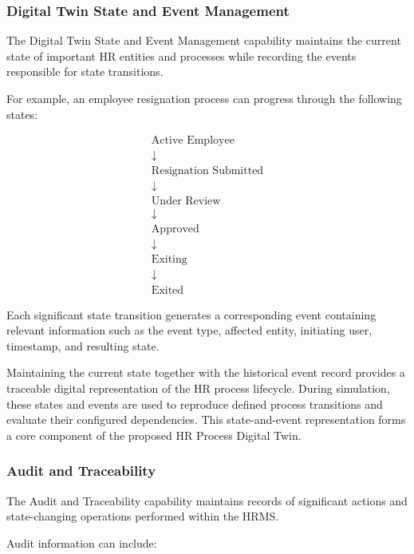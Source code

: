 \documentclass[12pt,a4paper]{article}
\begin{document}
\subsubsection{Digital Twin State and Event Management}

The Digital Twin State and Event Management capability maintains
the current state of important HR entities and processes while
recording the events responsible for state transitions.

For example, an employee resignation process can progress through
the following states:

\[
\begin{array}{c}
\text{Active Employee} \\[3pt]
\downarrow \\[3pt]
\text{Resignation Submitted} \\[3pt]
\downarrow \\[3pt]
\text{Under Review} \\[3pt]
\downarrow \\[3pt]
\text{Approved} \\[3pt]
\downarrow \\[3pt]
\text{Exiting} \\[3pt]
\downarrow \\[3pt]
\text{Exited}
\end{array}
\]

Each significant state transition generates a corresponding event
containing relevant information such as the event type, affected
entity, initiating user, timestamp, and resulting state.

Maintaining the current state together with the historical event
record provides a traceable digital representation of the HR
process lifecycle. During simulation, these states and events are
used to reproduce defined process transitions and evaluate their
configured dependencies. This state-and-event representation forms a
core component of the proposed HR Process Digital Twin.
\subsubsection{Audit and Traceability}

The Audit and Traceability capability maintains records of
significant actions and state-changing operations performed within
the HRMS.

Audit information can include:
\end{document}
